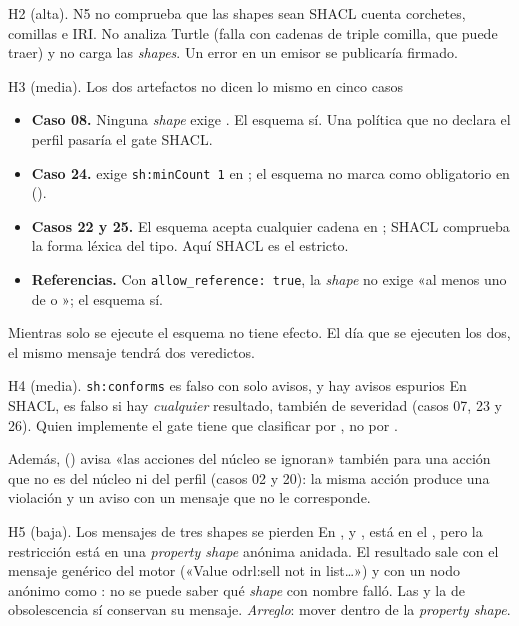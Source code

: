 \begin{hallazgo}{H2 (alta). N5 no comprueba que las shapes sean SHACL}
 cuenta corchetes, comillas e IRI. No analiza Turtle (falla con cadenas de triple comilla, que
 puede traer) y no carga las \emph{shapes}. Un error en un emisor se publicaría firmado.
\end{hallazgo}

\begin{hallazgo}{H3 (media). Los dos artefactos no dicen lo mismo en cinco casos}
\begin{itemize}[leftmargin=*, itemsep=1pt]
  \item \textbf{Caso 08.} Ninguna \emph{shape} exige . El esquema sí. Una política que no
        declara el perfil pasaría el gate SHACL.
  \item \textbf{Caso 24.}  exige \texttt{sh:minCount 1} en ; el esquema no
        marca  como obligatorio en  ().
  \item \textbf{Casos 22 y 25.} El esquema acepta cualquier cadena en ; SHACL comprueba la forma
        léxica del tipo. Aquí SHACL es el estricto.
  \item \textbf{Referencias.} Con \texttt{allow\_reference: true}, la \emph{shape} no exige «al menos uno de
         o »; el esquema sí.
\end{itemize}
Mientras solo se ejecute el esquema no tiene efecto. El día que se ejecuten los dos, el mismo mensaje tendrá dos
veredictos.
\end{hallazgo}

\begin{hallazgo}{H4 (media). \texttt{sh:conforms} es falso con solo avisos, y hay avisos espurios}
En SHACL,  es falso si hay \emph{cualquier} resultado, también de severidad 
(casos 07, 23 y 26). Quien implemente el gate tiene que clasificar por , no por
.

Además,  () avisa «las acciones del núcleo se ignoran» también
para una acción que no es del núcleo ni del perfil (casos 02 y 20): la misma acción produce una violación y un
aviso con un mensaje que no le corresponde.
\end{hallazgo}

\begin{hallazgo}{H5 (baja). Los mensajes de tres shapes se pierden}
En ,  y ,  está en el
, pero la restricción está en una \emph{property shape} anónima anidada. El resultado sale con el
mensaje genérico del motor («Value odrl:sell not in list…») y con un nodo anónimo como : no
se puede saber qué \emph{shape} con nombre falló. Las  y la de obsolescencia sí conservan su
mensaje. \emph{Arreglo}: mover  dentro de la \emph{property shape}.
\end{hallazgo}

